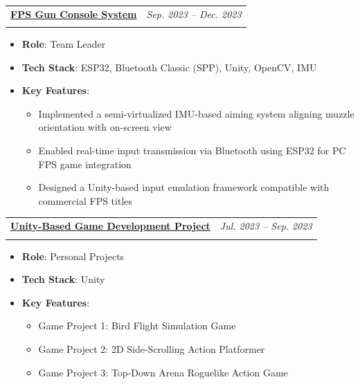 \documentclass[a4paper,11pt]{article}
\makeatletter
\newcommand{\resumeProject}[4]{%
\item
    \begin{tabular*}{0.98\textwidth}[t]{l@{\extracolsep{\fill}}r}
        \textbf{#1} & \textit{\footnotesize{#3}} \\
        \footnotesize{\textit{#2}} & \footnotesize{#4}
    \end{tabular*}
}
\newcommand{\resumeItemListStart}{\begin{itemize}}
\newcommand{\resumeItemListEnd}{\end{itemize}}
\makeatother
\begin{document}
\vspace{0.5em}

\resumeProject
{\href{https://moonshotfps1.notion.site/FPS-CONSOLE-PROJECT-1-efc70c403e4e4eee8b17e8ac6a4f5c15?pvs=74}{FPS Gun Console System}}
{}
{Sep. 2023 -- Dec. 2023}
{}
\vspace{-1.5em}
\resumeItemListStart
  \item \textbf{Role}: Team Leader
  \item \textbf{Tech Stack}: ESP32, Bluetooth Classic (SPP), Unity, OpenCV, IMU
  \item \textbf{Key Features}:
  \begin{itemize}[leftmargin=1.2em]
    \item Implemented a semi-virtualized IMU-based aiming system aligning muzzle orientation with on-screen view
    \item Enabled real-time input transmission via Bluetooth using ESP32 for PC FPS game integration
    \item Designed a Unity-based input emulation framework compatible with commercial FPS titles
  \end{itemize}
\resumeItemListEnd

\vspace{0.5em}

\resumeProject
{\href{https://www.youtube.com/shorts/RJIRCw1mdC4}{Unity-Based Game Development Project}}
{}
{Jul. 2023 -- Sep. 2023}
{}
\vspace{-1.5em}
\resumeItemListStart
  \item \textbf{Role}: Personal Projects
  \item \textbf{Tech Stack}: Unity
  \item \textbf{Key Features}:
  \begin{itemize}[leftmargin=1.2em]
    \item Game Project 1: Bird Flight Simulation Game 
    \item Game Project 2: 2D Side-Scrolling Action Platformer 
    \item Game Project 3: Top-Down Arena Roguelike Action Game
  \end{itemize}
\resumeItemListEnd
\end{document}

